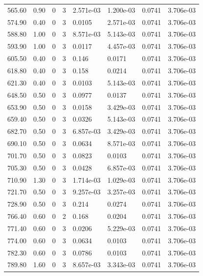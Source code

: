 \documentclass[preview]{standalone}
\begin{document}
{{{\begin{tabular}{L{1.2cm}C{1.2cm} C{0.3cm}C{0.5cm} C{1.4cm}C{1.4cm} C{1.4cm}C{1.4cm}}
  565.60  &  0.90  & 0     &  3 &  2.571e-03  & 1.200e-03  & 0.0741 &  3.706e-03   \\ 
  574.90  &  0.40  & 0     &  3 &  0.0105  & 2.571e-03  & 0.0741 &  3.706e-03   \\ 
  588.80  &  1.00  & 0     &  3 &  8.571e-03  & 5.143e-03  & 0.0741 &  3.706e-03   \\ 
  593.90  &  1.00  & 0     &  3 &  0.0117  & 4.457e-03  & 0.0741 &  3.706e-03   \\ 
  605.50  &  0.40  & 0     &  3 &  0.146  & 0.0171  & 0.0741 &  3.706e-03   \\ 
  618.80  &  0.40  & 0     &  3 &  0.158  & 0.0214  & 0.0741 &  3.706e-03   \\ 
  621.30  &  0.40  & 0     &  3 &  0.0103  & 5.143e-03  & 0.0741 &  3.706e-03   \\ 
  648.50  &  0.50  & 0     &  3 &  0.0977  & 0.0137  & 0.0741 &  3.706e-03   \\ 
  653.90  &  0.50  & 0     &  3 &  0.0158  & 3.429e-03  & 0.0741 &  3.706e-03   \\ 
  659.40  &  0.50  & 0     &  3 &  0.0326  & 5.143e-03  & 0.0741 &  3.706e-03   \\ 
  682.70  &  0.50  & 0     &  3 &  6.857e-03  & 3.429e-03  & 0.0741 &  3.706e-03   \\ 
  690.10  &  0.50  & 0     &  3 &  0.0634  & 8.571e-03  & 0.0741 &  3.706e-03   \\ 
  701.70  &  0.50  & 0     &  3 &  0.0823  & 0.0103  & 0.0741 &  3.706e-03   \\ 
  705.30  &  0.50  & 0     &  3 &  0.0428  & 6.857e-03  & 0.0741 &  3.706e-03   \\ 
  710.90  &  1.30  & 0     &  3 &  1.714e-03  & 1.029e-03  & 0.0741 &  3.706e-03   \\ 
  721.70  &  0.50  & 0     &  3 &  9.257e-03  & 3.257e-03  & 0.0741 &  3.706e-03   \\ 
  728.90  &  0.50  & 0     &  3 &  0.214  & 0.0274  & 0.0741 &  3.706e-03   \\ 
  766.40  &  0.60  & 0     &  2 &  0.168  & 0.0204  & 0.0741 &  3.706e-03   \\ 
  771.40  &  0.60  & 0     &  3 &  0.0206  & 5.229e-03  & 0.0741 &  3.706e-03   \\ 
  774.00  &  0.60  & 0     &  3 &  0.0634  & 0.0103  & 0.0741 &  3.706e-03   \\ 
  782.30  &  0.60  & 0     &  3 &  0.0786  & 0.0103  & 0.0741 &  3.706e-03   \\ 
  789.80  &  1.60  & 0     &  3 &  8.657e-03  & 3.343e-03  & 0.0741 &  3.706e-03   \\ 

\end{tabular}}}}
\end{document}
